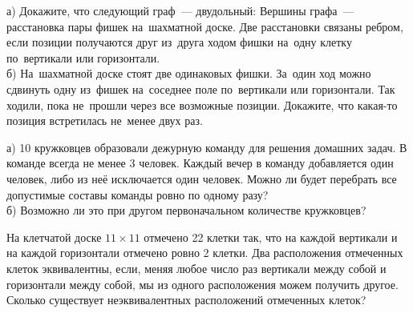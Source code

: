 \begin{problems}

\item а) Докажите, что следующий граф~--- двудольный:
Вершины графа~--- расстановка пары фишек на~шахматной доске. Две расстановки связаны ребром, если позиции получаются друг из~друга ходом фишки на~одну клетку по~вертикали или горизонтали.\\
б) На~шахматной доске стоят две одинаковых фишки.
За~один ход можно сдвинуть одну из~фишек на~соседнее поле по~вертикали или горизонтали. Так ходили, пока не~прошли через все возможные позиции. Докажите, что какая-то позиция встретилась не~менее двух раз.

\item а) 10 кружковцев образовали дежурную команду для решения домашних задач. В команде всегда не менее 3 человек. Каждый вечер в команду добавляется один человек, либо из неё исключается один человек. Можно ли будет перебрать все допустимые составы команды ровно по одному разу?\\
б) Возможно ли это при другом первоначальном количестве кружковцев?

\item На клетчатой доске $11\times 11$ отмечено 22 клетки так, что на каждой вертикали и на каждой горизонтали отмечено ровно 2 клетки. Два расположения отмеченных клеток эквивалентны, если, меняя любое число раз вертикали между собой и горизонтали между собой, мы из одного расположения можем получить другое. Сколько существует неэквивалентных расположений отмеченных клеток?
\end{problems}

